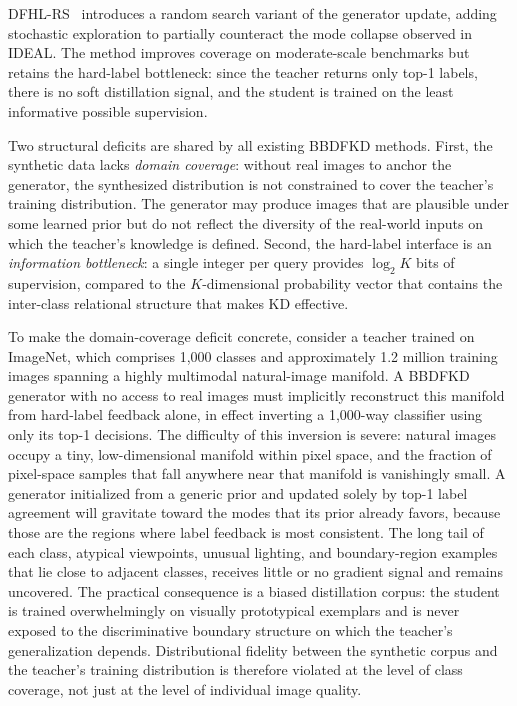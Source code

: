\begin{foldable}
  DFHL-RS~\cite{yuan2024data} introduces a random search variant of the generator update, adding stochastic exploration to partially counteract the mode collapse observed in IDEAL.
  The method improves coverage on moderate-scale benchmarks but retains the hard-label bottleneck: since the teacher returns only top-1 labels, there is no soft distillation signal, and the student is trained on the least informative possible supervision.
\end{foldable}

\begin{foldable}
  Two structural deficits are shared by all existing \ac{BBDFKD} methods.
  First, the synthetic data lacks \textit{domain coverage}: without real images to anchor the generator, the synthesized distribution is not constrained to cover the teacher's training distribution.
  The generator may produce images that are plausible under some learned prior but do not reflect the diversity of the real-world inputs on which the teacher's knowledge is defined.
  Second, the hard-label interface is an \textit{information bottleneck}: a single integer per query provides $\log_2 K$ bits of supervision, compared to the $K$-dimensional probability vector that contains the inter-class relational structure that makes \ac{KD} effective.
\end{foldable}

\begin{foldable}
  To make the domain-coverage deficit concrete, consider a teacher trained on ImageNet, which comprises 1{,}000 classes and approximately 1.2 million training images spanning a highly multimodal natural-image manifold.
  A \ac{BBDFKD} generator with no access to real images must implicitly reconstruct this manifold from hard-label feedback alone, in effect inverting a 1{,}000-way classifier using only its top-1 decisions.
  The difficulty of this inversion is severe: natural images occupy a tiny, low-dimensional manifold within pixel space, and the fraction of pixel-space samples that fall anywhere near that manifold is vanishingly small.
  A generator initialized from a generic prior and updated solely by top-1 label agreement will gravitate toward the modes that its prior already favors, because those are the regions where label feedback is most consistent.
  The long tail of each class, atypical viewpoints, unusual lighting, and boundary-region examples that lie close to adjacent classes, receives little or no gradient signal and remains uncovered.
  The practical consequence is a biased distillation corpus: the student is trained overwhelmingly on visually prototypical exemplars and is never exposed to the discriminative boundary structure on which the teacher's generalization depends.
  Distributional fidelity between the synthetic corpus and the teacher's training distribution is therefore violated at the level of class coverage, not just at the level of individual image quality.
\end{foldable}

